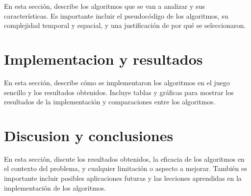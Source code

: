 \documentclass[10pt,twocolumn]{article}
\begin{document}
	En esta sección, describe los algoritmos que se van a analizar y sus características. Es importante incluir el pseudocódigo de los algoritmos, su complejidad temporal y espacial, y una justificación de por qué se seleccionaron.
	
	\section{Implementacion y resultados}
	
	En esta sección, describe cómo se implementaron los algoritmos en el juego sencillo y los resultados obtenidos. Incluye tablas y gráficas para mostrar los resultados de la implementación y comparaciones entre los algoritmos.
	
	\section{Discusion y conclusiones}
	
	En esta sección, discute los resultados obtenidos, la eficacia de los algoritmos en el contexto del problema, y cualquier limitación o aspecto a mejorar. También es importante incluir posibles aplicaciones futuras y las lecciones aprendidas en la implementación de los algoritmos.
	
		


	
	
\end{document}
